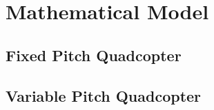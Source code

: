 \section{Mathematical Model}

\subsection{Fixed Pitch Quadcopter}
\subsection{Variable Pitch Quadcopter}